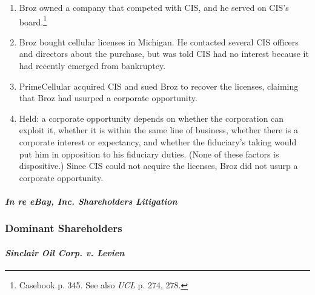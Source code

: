 \begin{enumerate}
    \item Broz owned a company that competed with CIS, and he served on CIS's 
    board.\footnote{Casebook p. 345. See also \emph{UCL} p. 274, 278.}
    \item Broz bought cellular licenses in Michigan. He contacted several CIS 
    officers and directors about the purchase, but was told CIS had no interest 
    because it had recently emerged from bankruptcy.
    \item PrimeCellular acquired CIS and sued Broz to recover the licenses, 
    claiming that Broz had usurped a corporate opportunity.
    \item Held: a corporate opportunity depends on whether the corporation can 
    exploit it, whether it is within the same line of business, whether there is 
    a corporate interest or expectancy, and whether the fiduciary's taking would 
    put him in opposition to his fiduciary duties. (None of these factors is 
    dispositive.) Since CIS could not acquire the licenses, Broz did not usurp a 
    corporate opportunity.
\end{enumerate}

\paragraph{\emph{In re eBay, Inc. Shareholders Litigation}}


\newpage %

\subsubsection{Dominant Shareholders}

\paragraph{\emph{Sinclair Oil Corp. v. Levien}}

